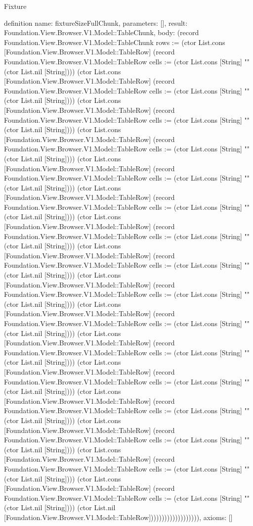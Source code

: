 \begin{lexlean}{Fixture}
\begin{semanticmodule}
definition{
  name: fixtureSizeFullChunk,
  parameters: [],
  result: Foundation.View.Browser.V1.Model::TableChunk,
  body: (record Foundation.View.Browser.V1.Model::TableChunk {rows := (ctor List.cons [Foundation.View.Browser.V1.Model::TableRow] (record Foundation.View.Browser.V1.Model::TableRow {cells := (ctor List.cons [String] "" (ctor List.nil [String]))}) (ctor List.cons [Foundation.View.Browser.V1.Model::TableRow] (record Foundation.View.Browser.V1.Model::TableRow {cells := (ctor List.cons [String] "" (ctor List.nil [String]))}) (ctor List.cons [Foundation.View.Browser.V1.Model::TableRow] (record Foundation.View.Browser.V1.Model::TableRow {cells := (ctor List.cons [String] "" (ctor List.nil [String]))}) (ctor List.cons [Foundation.View.Browser.V1.Model::TableRow] (record Foundation.View.Browser.V1.Model::TableRow {cells := (ctor List.cons [String] "" (ctor List.nil [String]))}) (ctor List.cons [Foundation.View.Browser.V1.Model::TableRow] (record Foundation.View.Browser.V1.Model::TableRow {cells := (ctor List.cons [String] "" (ctor List.nil [String]))}) (ctor List.cons [Foundation.View.Browser.V1.Model::TableRow] (record Foundation.View.Browser.V1.Model::TableRow {cells := (ctor List.cons [String] "" (ctor List.nil [String]))}) (ctor List.cons [Foundation.View.Browser.V1.Model::TableRow] (record Foundation.View.Browser.V1.Model::TableRow {cells := (ctor List.cons [String] "" (ctor List.nil [String]))}) (ctor List.cons [Foundation.View.Browser.V1.Model::TableRow] (record Foundation.View.Browser.V1.Model::TableRow {cells := (ctor List.cons [String] "" (ctor List.nil [String]))}) (ctor List.cons [Foundation.View.Browser.V1.Model::TableRow] (record Foundation.View.Browser.V1.Model::TableRow {cells := (ctor List.cons [String] "" (ctor List.nil [String]))}) (ctor List.cons [Foundation.View.Browser.V1.Model::TableRow] (record Foundation.View.Browser.V1.Model::TableRow {cells := (ctor List.cons [String] "" (ctor List.nil [String]))}) (ctor List.cons [Foundation.View.Browser.V1.Model::TableRow] (record Foundation.View.Browser.V1.Model::TableRow {cells := (ctor List.cons [String] "" (ctor List.nil [String]))}) (ctor List.cons [Foundation.View.Browser.V1.Model::TableRow] (record Foundation.View.Browser.V1.Model::TableRow {cells := (ctor List.cons [String] "" (ctor List.nil [String]))}) (ctor List.cons [Foundation.View.Browser.V1.Model::TableRow] (record Foundation.View.Browser.V1.Model::TableRow {cells := (ctor List.cons [String] "" (ctor List.nil [String]))}) (ctor List.cons [Foundation.View.Browser.V1.Model::TableRow] (record Foundation.View.Browser.V1.Model::TableRow {cells := (ctor List.cons [String] "" (ctor List.nil [String]))}) (ctor List.cons [Foundation.View.Browser.V1.Model::TableRow] (record Foundation.View.Browser.V1.Model::TableRow {cells := (ctor List.cons [String] "" (ctor List.nil [String]))}) (ctor List.cons [Foundation.View.Browser.V1.Model::TableRow] (record Foundation.View.Browser.V1.Model::TableRow {cells := (ctor List.cons [String] "" (ctor List.nil [String]))}) (ctor List.nil [Foundation.View.Browser.V1.Model::TableRow])))))))))))))))))}),
  axioms: []
}


\end{semanticmodule}
\end{lexlean}

